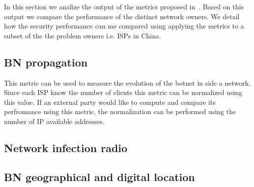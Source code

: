 \label{cap:sec2}
In this section we analize the output of the metrics proposed in~\cite{owr_article}. Based on this output we compare the performance of the distinct network owners. We detail how the security performance can me compared using applying the metrics to a subset of the the problem owners i.e. ISPs in China.

\subsection{BN propagation}
This metric can be used to measure the evolution of the botnet in side a network. Since each ISP know the number of clients this metric can be normalized using this value. If an external party would like to compute and compare its perfromance using this metric, the normalization can be performed using the number of IP available addresses.

\subsection{Network infection radio}
\subsection{BN geographical and digital location}
